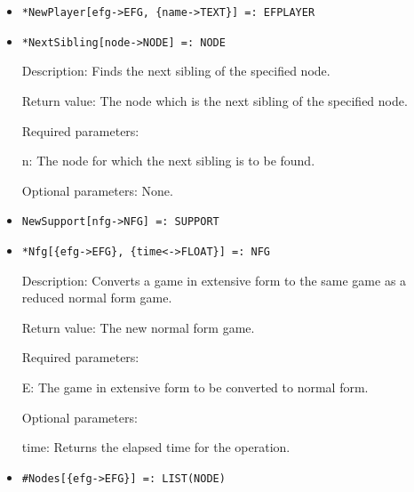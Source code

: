 \begin{itemize}
\item
\protect \large \begin{verbatim}
*NewPlayer[efg->EFG, {name->TEXT}] =: EFPLAYER 
\end{verbatim}\normalsize

\item
\protect \large \begin{verbatim}
*NextSibling[node->NODE] =: NODE
\end{verbatim}\normalsize

\bd
\item
[Description:] Finds the next sibling of the specified node.
\item
[Return value:] The node which is the next sibling of the specified
node.
\item
[Required parameters:]\hfil\null

\bd
\item
[n:] The node for which the next sibling is to be found.
\ed

\item
[Optional parameters:] None.
\ed


\item
\protect \large \begin{verbatim}
NewSupport[nfg->NFG] =: SUPPORT
\end{verbatim}\normalsize

\item
\protect \large \begin{verbatim}
*Nfg[{efg->EFG}, {time<->FLOAT}] =: NFG
\end{verbatim}\normalsize

\bd
\item
[Description:] Converts a game in extensive form to the same
game as a reduced normal form game.
\item
[Return value:] The new normal form game.
\item
[Required parameters:]\hfil\null
	
\bd
\item
[E:] The game in extensive form to be converted to normal form.
\ed

\item
[Optional parameters:]\hfil\null
	
\bd
\item
[time:] Returns the elapsed time for the operation.
\ed
\ed

\item
\protect \large \begin{verbatim} 
#Nodes[{efg->EFG}] =: LIST(NODE)
\end{verbatim}\normalsize


\end{itemize}
